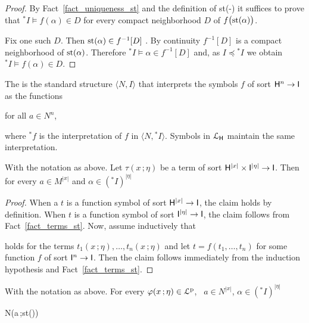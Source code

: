 \documentclass{amsproc}
\renewcommand*{\emph}[1]{%
   \smash{\tikz[baseline]\node[rectangle, fill=teal!25, rounded corners, inner xsep=0.5ex, inner ysep=0.2ex, anchor=base, minimum height = 2.7ex]{\strut #1};}}
\begin{document}
\begin{proof}
  By Fact~\ref{fact_uniqueness_st} and the definition of st(-) it suffices to prove that ${}^*\!\!I\models f(\alpha)\in D$ for every compact neighborhood $D$ of $f\big({\rm st}(\alpha)\big)$.
  
  Fix one such $D$.
  Then ${\rm st}(\alpha)\in f^{-1}[D]$ .
  By continuity $f^{-1}[D]$ is a compact neighborhood of ${\rm st}(\alpha)$.
  Therefore ${}^*\!\!I\models \alpha\in f^{-1}[D]$ and, as $I\preceq{}^*\!\!I$ we obtain ${}^*\!\!I\models f(\alpha)\in D$.
\end{proof}

The \emph{standard part of $\langle N,{}^*\!\!I\rangle$\/} is the standard structure $\langle N,I\rangle$ that interprets the symbols $f$ of sort ${\sf H}^n\to {\sf I}$ as the functions

\hfill for all $a\in N^n$,

where ${}^*\!\!f$ is the interpretation of $f$ in  $\langle N,{}^*\!\!I\rangle$.
Symbols in ${\EuScript L}_{\sf H}$ maintain the same interpretation.

\begin{fact}\label{fact_st2} 
  With the notation as above.
  Let $\tau(x\,;\eta)$ be a term of sort ${\sf H}^{|x|}\times{\sf I}^{|\eta|}\to {\sf I}$.
  Then for every $a\in M^{|x|}$ and $\alpha\in({}^*\!\!I)^{|\eta|}$

\end{fact}
\begin{proof}
  When a $t$ is a function symbol of sort  ${\sf H}^{|x|}\to {\sf I}$, the claim holds by definition.
  When $t$ is a function symbol of sort ${\sf I}^{|\eta|}\to {\sf I}$, the claim follows from Fact~\ref{fact_terms_st}.
  Now, assume inductively that 


  holds for the terms $t_1(x\,;\eta),\dots,t_n(x\,;\eta)$ and let $t=f(t_1,\dots,t_n)$ for some function $f$ of sort ${\sf I}^n\to {\sf I}$.
  Then the claim follows immediately from the induction hypothesis and Fact~\ref{fact_terms_st}.
\end{proof}


\begin{lemma}\label{lem_st}
  With the notation as above.
  For every $\varphi(x\,;\eta)\in{\EuScript L}^{\rm p}$, \  $a\in N^{|x|}$, $\alpha\in({}^*\!\!I)^{|\eta|}$ 
  
  {\Rightarrow}
  {N\models\varphi\big(a\,;{\rm st}(\alpha)\big)}
\end{lemma}
\end{document}
